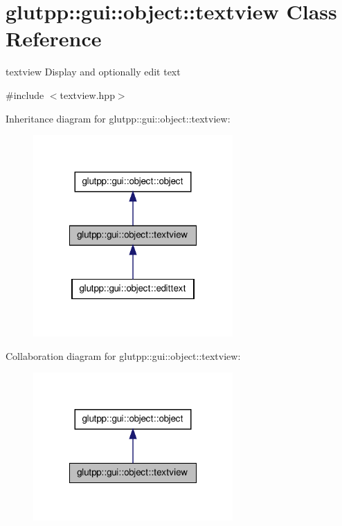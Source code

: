 \hypertarget{classglutpp_1_1gui_1_1object_1_1textview}{\section{glutpp\-:\-:gui\-:\-:object\-:\-:textview \-Class \-Reference}
\label{classglutpp_1_1gui_1_1object_1_1textview}
}


textview \-Display and optionally edit text  




{\ttfamily \#include $<$textview.\-hpp$>$}



\-Inheritance diagram for glutpp\-:\-:gui\-:\-:object\-:\-:textview\-:\nopagebreak
\begin{figure}[H]
\begin{center}
\leavevmode
\includegraphics[width=216pt]{classglutpp_1_1gui_1_1object_1_1textview__inherit__graph}
\end{center}
\end{figure}


\-Collaboration diagram for glutpp\-:\-:gui\-:\-:object\-:\-:textview\-:\nopagebreak
\begin{figure}[H]
\begin{center}
\leavevmode
\includegraphics[width=216pt]{classglutpp_1_1gui_1_1object_1_1textview__coll__graph}
\end{center}
\end{figure}
